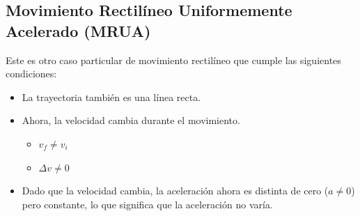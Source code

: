 

\subsection{Movimiento Rectilíneo Uniformemente Acelerado (MRUA)}

Este es otro caso particular de movimiento rectilíneo que cumple las siguientes condiciones:
\begin{itemize}
    \item La trayectoria también es una línea recta.
    \item Ahora, la velocidad cambia durante el movimiento.
    \begin{itemize}
        \item \( v_f \neq v_i \)
        \item \( \Delta v \neq  0 \)
    \end{itemize}
    \item Dado que la velocidad cambia, la aceleración ahora es distinta de cero (\( a \neq 0 \)) pero constante, lo que significa que la aceleración no varía.
\end{itemize}

